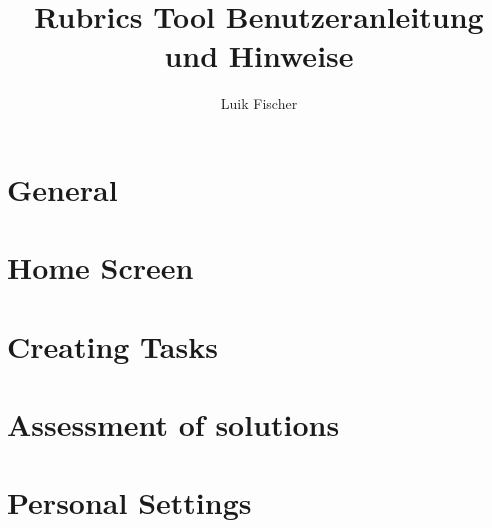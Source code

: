 \documentclass[10.5pt]{article}
\author{Luik Fischer}
\title{Rubrics Tool Benutzeranleitung und Hinweise}
\begin{document}

\section{General}
\label{sec:general}

\section{Home Screen}
\label{sec:home}

\section{Creating Tasks}
\label{sec:taskcreation}

\section{Assessment of solutions}
\label{sec:assessment}

\section{Personal Settings}
\label{sec:settings}


\newpage
\end{document}
